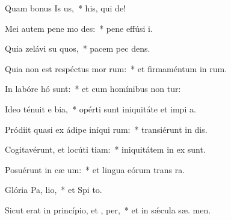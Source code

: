 \item Quam bonus Is us,~* his, qui   de!
\item Mei autem pene mo  des:~* pene effúsi   i.
\item Quia zelávi su quos,~* pacem pec dens.
\item Quia non est respéctus mor rum:~* et firmaméntum in  rum.
\item In labóre hó  sunt:~* et cum homínibus non tur:
\item Ideo ténuit e bia,~* opérti sunt iniquitáte et impi a.
\item Pródiit quasi ex ádipe iníqui rum:~* transiérunt in  dis.
\item Cogitavérunt, et locúti  tiam:~* iniquitátem in ex  sunt.
\item Posuérunt in cæ  um:~* et lingua eórum trans  ra.
\item Glória Pa,  lio,~* et Spi to.
\item Sicut erat in princípio, et ,  per,~* et in sǽcula sæ. men.

